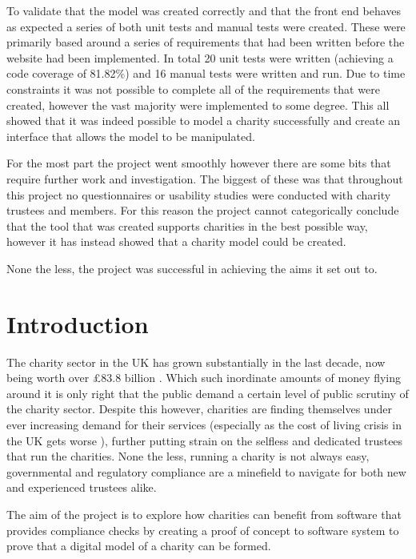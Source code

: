 \documentclass{UoYCSproject}
\begin{document}
To validate that the model was created correctly and that the front end behaves as expected a series of both unit tests and manual tests were created. These were primarily based around a series of requirements that had been written before the website had been implemented. In total 20 unit tests were written (achieving a code coverage of 81.82\%) and 16 manual tests were written and run. Due to time constraints it was not possible to complete all of the requirements that were created, however the vast majority were implemented to some degree. This all showed that it was indeed possible to model a charity successfully and create an interface that allows the model to be manipulated. 

For the most part the project went smoothly however there are some bits that require further work and investigation. The biggest of these was that throughout this project no questionnaires or usability studies were conducted with charity trustees and members. For this reason the project cannot categorically conclude that the tool that was created supports charities in the best possible way, however it has instead showed that a charity model could be created.

None the less, the project was successful in achieving the aims it set out to.


\chapter{Introduction}
\label{cha:introduction}


The charity sector in the UK has grown substantially in the last decade, now being worth over £83.8 billion \cite{commission_report_2022}. Which such inordinate amounts of money flying around it is only right that the public demand a certain level of public scrutiny of the charity sector. Despite this however, charities are finding themselves under ever increasing demand for their services (especially as the cost of living crisis in the UK gets worse \cite{butler_2023}), further putting strain on the selfless and dedicated trustees that run the charities. None the less, running a charity is not always easy, governmental and regulatory compliance are a minefield to navigate for both new and experienced trustees alike.

The aim of the project is to explore how charities can benefit from software that provides compliance checks by creating a proof of concept to software system to prove that a digital model of a charity can be formed.
\end{document}
